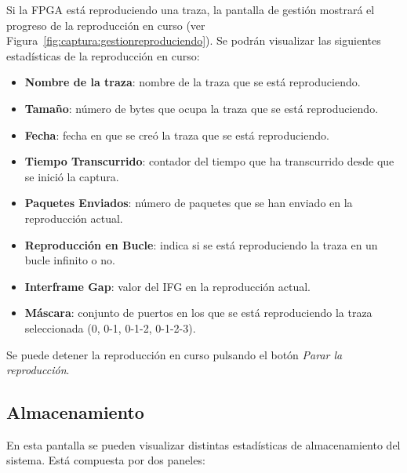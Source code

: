 Si la \gls{FPGA} está reproduciendo una \gls{traza}, la pantalla de gestión mostrará el progreso de la reproducción en curso (ver Figura~\ref{fig:captura:gestionreproduciendo}).
Se podrán visualizar las siguientes estadísticas de la reproducción en curso:
\begin{itemize}
  \item \textbf{Nombre de la \gls{traza}}: nombre de la \gls{traza} que se está reproduciendo.
  \item \textbf{Tamaño}: número de bytes que ocupa la \gls{traza} que se está reproduciendo.
  \item \textbf{Fecha}: fecha en que se creó la \gls{traza} que se está reproduciendo.
  \item \textbf{Tiempo Transcurrido}: contador del tiempo que ha transcurrido desde que se inició la captura.
  \item \textbf{Paquetes Enviados}: número de paquetes que se han enviado en la reproducción actual.
  \item \textbf{Reproducción en Bucle}: indica si se está reproduciendo la \gls{traza} en un bucle infinito o no.
  \item \textbf{Interframe Gap}: valor del \gls{IFG} en la reproducción actual.
  \item \textbf{Máscara}: conjunto de puertos en los que se está reproduciendo la \gls{traza} seleccionada (0, 0-1, 0-1-2, 0-1-2-3).
\end{itemize}

Se puede detener la reproducción en curso pulsando el botón \textit{Parar la reproducción}.


\subsection{Almacenamiento\label{extra:manual:almacenamiento}}

En esta pantalla se pueden visualizar distintas estadísticas de almacenamiento del sistema.
Está compuesta por dos paneles:

